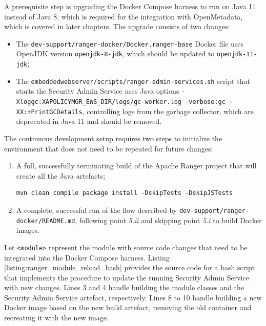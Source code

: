 A prerequisite step is upgrading the Docker Compose harness to run on Java 11 instead of Java 8, which is required for the integration with OpenMetadata, which is covered in later chapters. The upgrade consists of two changes:

\begin{itemize}
    \item The \texttt{dev-support/ranger-docker/Docker.ranger-base} Docker file uses OpenJDK version \texttt{openjdk-8-jdk}, which should be updated to \texttt{openjdk-11-jdk};
    \item The \texttt{embeddedwebserver/scripts/ranger-admin-services.sh} script that starts the Security Admin Service uses Java options \texttt{-Xloggc:{XAPOLICYMGR_EWS_DIR}/logs/gc-worker.log -verbose:gc -XX:+PrintGCDetails}, controlling logs from the garbage collector, which are deprecated in Java 11 and should be removed.
\end{itemize}

The continuous development setup requires two steps to initialize the environment that does not need to be repeated for future changes:

\begin{enumerate}

\item A full, successfully terminating build of the Apache Ranger project that will create all the Java artefacts;
\begin{verbatim}
mvn clean compile package install -DskipTests -DskipJSTests
\end{verbatim}

\item A complete, successful run of the flow described by \texttt{dev-support/ranger-docker/README.md}, following point \textit{5.ii} and skipping point \textit{5.i} to build Docker images.

\end{enumerate}

Let \texttt{<module>} represent the module with source code changes that need to be integrated into the Docker Compose harness. Listing \ref{listing:ranger_module_reload_bash} provides the source code for a bash script that implements the procedure to update the running Security Admin Service with new changes. Lines 3 and 4 handle building the module classes and the Security Admin Service artefact, respectively. Lines 8 to 10 handle building a new Docker image based on the new build artefact, removing the old container and recreating it with the new image. 

